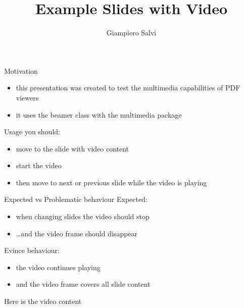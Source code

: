 \documentclass[xcolor=table,12pt]{beamer}
\title{Example Slides with Video}
\author{Giampiero Salvi}
\begin{document}
\frame{\titlepage}

\begin{frame}{Motivation}
  \begin{itemize}
  \item this presentation was created to test the multimedia capabilities of PDF viewers
  \item it uses the beamer class with the multimedia package
  \end{itemize}
\end{frame}

\begin{frame}{Usage}
  you should:
  \begin{itemize}
  \item move to the slide with video content
  \item start the video
  \item then move to next or previous slide while the video is playing
  \end{itemize}
\end{frame}

\begin{frame}{Expected vs Problematic behaviour}
  Expected:
  \begin{itemize}
  \item when changing slides the video should stop
  \item \dots and the video frame should disappear
  \end{itemize}

  Evince behaviour:
  \begin{itemize}
  \item the video continues playing
  \item and the video frame covers all slide content
  \end{itemize}
\end{frame}

\begin{frame}{Here is the video content}
  \begin{center}
  \end{center}
\end{frame}
\end{document}
